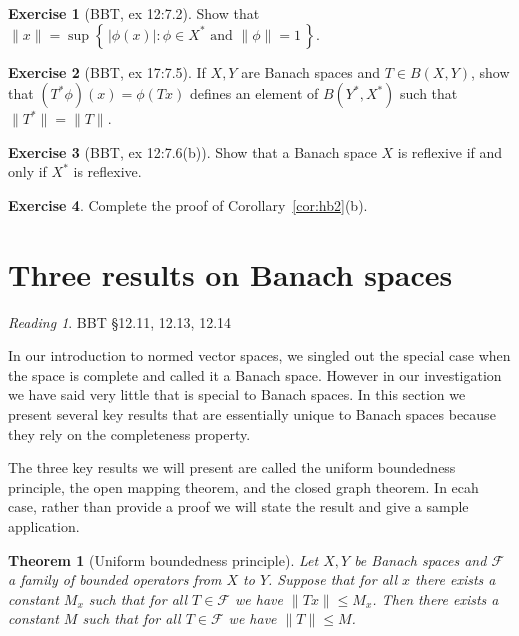\documentclass[11pt,oneside]{amsbook}
\newcommand{\set}[1]{\left\{\,#1\,\right\}}
\theoremstyle{definition}
\newtheorem{exerc}{Exercise}[section]
\theoremstyle{plain}
\newtheorem{thm}{Theorem}[section]
\theoremstyle{definition}
\theoremstyle{remark}
\newtheorem*{reading}{Reading}
\numberwithin{equation}{section}
\numberwithin{figure}{section}
\begin{document}
\begin{exerc}[BBT, ex 12:7.2]
  Show that $\|x\|=\sup\set{|\phi(x)|:\phi\in X^*\text{ and }\|\phi\|=1}$.
\end{exerc}

\begin{exerc}[BBT, ex 17:7.5]
  If $X,Y$ are Banach spaces and $T\in B(X,Y)$, show that $(T^*\phi)(x)=\phi(Tx)$ defines an element of $B(Y^*,X^*)$ such that $\|T^*\|=\|T\|$.
\end{exerc}

\begin{exerc}[BBT, ex 12:7.6(b)]
  Show that a Banach space $X$ is reflexive if and only if $X^*$ is reflexive.
\end{exerc}


\begin{exerc}
  Complete the proof of Corollary~\ref{cor:hb2}(b).
\end{exerc}

\newpage
\section{Three results on Banach spaces}

\begin{reading}
  BBT \S 12.11, 12.13, 12.14
\end{reading}

In our introduction to normed vector spaces, we singled out the special case when the space is complete and called it a Banach space. However in our investigation we have said  very little that is special to Banach spaces. In this section we present several key results that are essentially unique to Banach spaces because they rely on the completeness property.

The three key results we will present are called the uniform boundedness principle, the open mapping theorem, and the closed graph theorem. In ecah case, rather than provide a proof we will state the result and give a sample application.

\begin{thm}[Uniform boundedness principle]
  Let $X,Y$ be Banach spaces and $\mathcal F$ a family of bounded operators from $X$ to $Y$. Suppose that for all $x$ there exists a constant $M_x$ such that for all $T\in\mathcal F$ we have $\|Tx\|\leq M_x$. Then there exists a constant $M$ such that for all $T\in\mathcal F$ we have $\|T\|\leq M$.
\end{thm}
\end{document}
